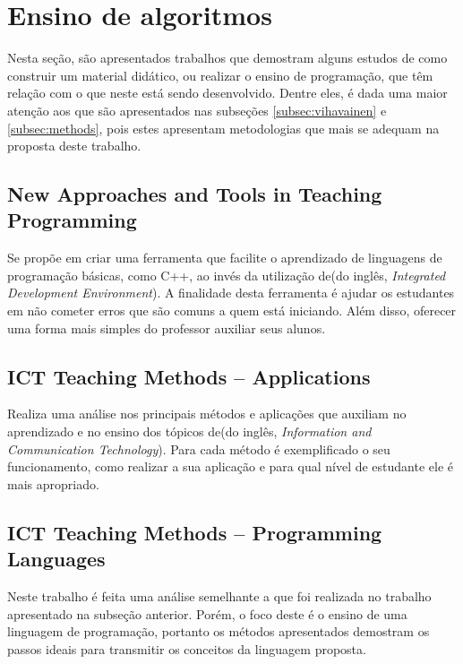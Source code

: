 \section{Ensino de algoritmos}
\label{sec:ensino}

Nesta seção, são apresentados trabalhos que demostram alguns estudos de como construir um material didático, ou realizar o ensino de programação, que têm relação com o que neste está sendo desenvolvido. Dentre eles, é dada uma maior atenção aos que são apresentados nas subseções \ref{subsec:vihavainen} e \ref{subsec:methods}, pois estes apresentam metodologias que mais se adequam na proposta deste trabalho. 


\subsection{New Approaches and Tools in Teaching Programming} \nocite{newapproach}

Se propõe em criar uma ferramenta que facilite o aprendizado de linguagens de programação básicas, como C++, ao invés da utilização de(do inglês, \textit{Integrated Development Environment}). A finalidade desta ferramenta é ajudar os estudantes em não cometer erros que são comuns a quem está iniciando. Além disso, oferecer uma forma mais simples do professor auxiliar seus alunos.

\subsection{ICT Teaching Methods – Applications} \nocite{teachingapplications}

Realiza uma análise nos principais métodos e aplicações que auxiliam no aprendizado e no ensino dos tópicos de(do inglês, \textit{Information and Communication Technology}). Para cada método é exemplificado o seu funcionamento, como realizar a sua aplicação e para qual nível de estudante ele é mais apropriado. 


\subsection{ICT Teaching Methods – Programming Languages} \nocite{teachingapplicationslanguages}

Neste trabalho é feita uma análise semelhante a que foi realizada no trabalho apresentado na subseção anterior. Porém, o foco deste é o ensino de uma linguagem de programação, portanto os métodos apresentados demostram os passos ideais para transmitir os conceitos da linguagem proposta.

